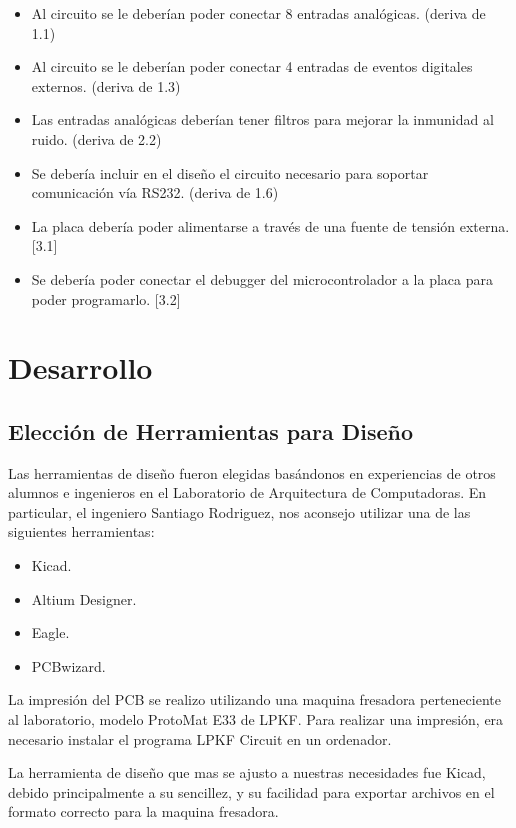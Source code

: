 \begin{itemize}
\item Al circuito se le deberían poder conectar 8 entradas analógicas. (deriva de 1.1)
\item Al circuito se le deberían poder conectar 4 entradas de eventos digitales externos. (deriva de 1.3)
\item Las entradas analógicas deberían tener filtros para mejorar la inmunidad al ruido. (deriva de 2.2)
\item Se debería incluir en el diseño el circuito necesario para soportar comunicación vía RS232. (deriva de 1.6)
\item La placa debería poder alimentarse a través de una fuente de tensión externa. [3.1]
\item Se debería poder conectar el debugger del microcontrolador a la placa para poder programarlo. [3.2]
\end{itemize}



\section{Desarrollo} %
\label{it3:sec:desarrollo}

\subsection{Elección de Herramientas para Diseño} %
\label{it3:sub:herramientas_para_diseno}

Las herramientas de diseño fueron elegidas basándonos en experiencias de otros alumnos e ingenieros en el Laboratorio de Arquitectura de Computadoras. En particular, el ingeniero Santiago Rodriguez, nos aconsejo utilizar una de las siguientes herramientas:

\begin{itemize}
\item Kicad.
\item Altium Designer.
\item Eagle.
\item PCBwizard.
\end{itemize}

La impresión del PCB se realizo utilizando una maquina fresadora perteneciente al laboratorio, modelo ProtoMat E33 de LPKF. Para realizar una impresión, era necesario instalar el programa LPKF Circuit en un ordenador.

La herramienta de diseño que mas se ajusto a nuestras necesidades fue Kicad, debido principalmente a su sencillez, y su facilidad para exportar archivos en el formato correcto para la maquina fresadora.

